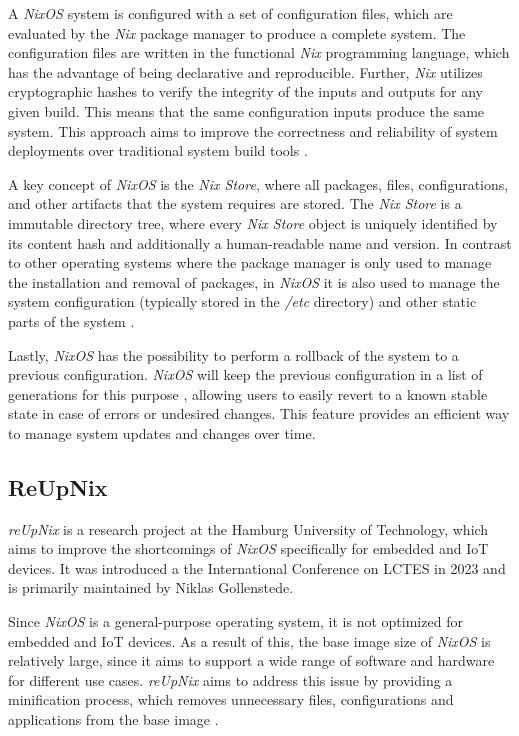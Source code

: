 A \textit{NixOS} system is configured with a set of configuration files, which
are evaluated by the \textit{Nix} package manager to produce a complete system.
The configuration files are written in the functional \textit{Nix} programming language,
which has the advantage of being declarative and reproducible. Further, \textit{Nix}
utilizes cryptographic hashes to verify the integrity of the inputs and outputs
for any given build. This means that the same configuration inputs produce the
same system. This approach aims to improve the correctness and reliability of
system deployments over traditional system build tools \cite{dolstra2006}.

A key concept of \textit{NixOS} is the \textit{Nix Store}, where all packages,
files, configurations, and other artifacts that the system requires are stored.
The \textit{Nix Store} is a immutable directory tree, where every \textit{Nix Store}
object is uniquely identified by its content hash and additionally a
human-readable name and version. In contrast to other operating systems where the package
manager is only used to manage the installation and removal of packages, in \textit{NixOS}
it is also used to manage the system configuration (typically stored in the
\textit{/etc} directory) and other static parts of the
system \cite{1411255}.

Lastly, \textit{NixOS} has the possibility to perform a rollback of the system to a
previous configuration. \textit{NixOS} will keep the previous configuration
in a list of generations for this purpose \cite{1411255}, allowing users to easily
revert to a known stable state in case of errors or undesired changes. This
feature provides an efficient way to manage system updates and changes over time.

\subsection{ReUpNix}
\textit{reUpNix} is a research project at the Hamburg University of Technology,
which aims to improve the shortcomings of \textit{NixOS} specifically for
embedded and \ac{IoT} devices. It was introduced a the International Conference on
\ac{LCTES} in 2023 and is primarily maintained by Niklas Gollenstede.

Since \textit{NixOS} is a general-purpose operating system, it is not optimized
for embedded and \ac{IoT} devices. As a result of this, the base image size of
\textit{NixOS} is relatively large, since it aims to support a wide range of
software and hardware for different use cases. \textit{reUpNix} aims to address
this issue by providing a minification process, which removes unnecessary
files, configurations and applications from the base image \cite{gollenstede:23:lctes}.

